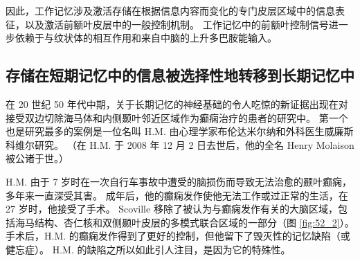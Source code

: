 因此，工作记忆涉及激活存储在根据信息内容而变化的专门皮层区域中的信息表征，以及激活前额叶皮层中的一般控制机制。
工作记忆中的前额叶控制信号进一步依赖于与纹状体的相互作用和来自中脑的上升多巴胺能输入。



\subsection{存储在短期记忆中的信息被选择性地转移到长期记忆中}

在 20 世纪 50 年代中期，关于长期记忆的神经基础的令人吃惊的新证据出现在对接受双边切除海马体和内侧颞叶邻近区域作为癫痫治疗的患者的研究中。
第一个也是研究最多的案例是一位名叫 H.M. 由心理学家布伦达米尔纳和外科医生威廉斯科维尔研究。 （在 H.M. 于 2008 年 12 月 2 日去世后，他的全名 Henry Molaison 被公诸于世。）


H.M. 由于 7 岁时在一次自行车事故中遭受的脑损伤而导致无法治愈的颞叶癫痫，多年来一直深受其害。
成年后，他的癫痫发作使他无法工作或过正常的生活，在 27 岁时，他接受了手术。
Scoville 移除了被认为与癫痫发作有关的大脑区域，包括海马结构、杏仁核和双侧颞叶皮层的多模式联合区域的一部分（图 \ref{fig:52_2}）。
手术后，H.M. 的癫痫发作得到了更好的控制，但他留下了毁灭性的记忆缺陷（或健忘症）。
H.M. 的缺陷之所以如此引人注目，是因为它的特殊性。


